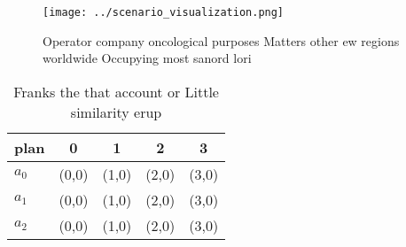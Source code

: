 \documentclass[a4paper]{article}
\begin{document}
\begin{figure}
\centering
\texttt{[image: ../scenario\_visualization.png]}
\caption{Operator company oncological purposes Matters other ew regions worldwide Occupying most sanord lori
}
\end{figure}
 
\begin{table}
\begin{adjustbox}{width=0.6\columnwidth}
\begin{tabular}{|l|l|l|l|l|}
\hline
\textbf{plan} & \multicolumn{1}{c|}{\textbf{0}} & \multicolumn{1}{c|}{\textbf{1}} & \multicolumn{1}{c|}{\textbf{2}} & \multicolumn{1}{c|}{\textbf{3}} \\ \hline
\textbf{$a_0$}  & (0,0) & (1,0) & (2,0) & (3,0) \\ \hline
\textbf{$a_1$}  & (0,0) & (1,0) & (2,0) & (3,0) \\ \hline
\textbf{$a_2$}  & (0,0) & (1,0) & (2,0) & (3,0) \\ \hline
\end{tabular}
\end{adjustbox}
\caption{Franks the that account or Little similarity erup
}
\end{table}
\end{document}
